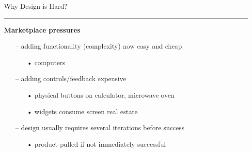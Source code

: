 \documentclass[pdf]{beamer}
\begin{document}
\begin{frame}
	{Why Design is Hard?}{\textcolor{red}{\rule{12cm}{1.2pt}}}
	
\large{\textbf{Marketplace pressures}}
 \bigskip
 
 \begin{itemize}
    \item[--] \small{adding functionality (complexity) now easy and cheap }
    \begin{itemize}
              \item[\textcolor{black}{•}] \footnotesize{computers}
     \end{itemize}
     
      \bigskip
      \item[--] \small{adding controls/feedback expensive }
          \begin{itemize}
              \item[\textcolor{black}{•}] \footnotesize{physical buttons on calculator, microwave oven}
			 \item[\textcolor{black}{•}] \footnotesize{widgets consume screen real estate}
     \end{itemize}
     
     \bigskip
     \item[--] \small{design usually requires several iterations before success}
          \begin{itemize}
              \item[\textcolor{black}{•}] \footnotesize{ product pulled if not immediately successful}
     \end{itemize}
  \end{itemize}
  
 \bigskip  \bigskip  \bigskip
 
\end{frame}



\end{document}
